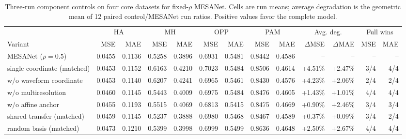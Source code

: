 \begin{table}[t]
\centering
\setlength{\tabcolsep}{1.05pt}
\caption{Three-run component controls on four core datasets for fixed-$\rho$
MESANet. Cells are run means; average degradation is the geometric mean of 12
paired control/MESANet run ratios. Positive values favor the complete model.}
\label{tab:v671-controls}
\begin{tabular}{@{}l*{4}{rr}rrrr@{}}
\toprule
& \multicolumn{2}{c}{HA} & \multicolumn{2}{c}{MH} & \multicolumn{2}{c}{OPP} & \multicolumn{2}{c}{PAM} & \multicolumn{2}{c}{Avg. deg.} & \multicolumn{2}{c}{Full wins} \\
Variant & MSE & MAE & MSE & MAE & MSE & MAE & MSE & MAE & $\Delta$MSE & $\Delta$MAE & MSE & MAE \\
\midrule
MESANet ($\rho=0.5$) & 0.0455 & 0.1136 & 0.5258 & 0.3896 & 0.6931 & 0.5481 & 0.8442 & 0.4586 & -- & -- & -- & -- \\
single coordinate (matched) & 0.0453 & 0.1152 & 0.6163 & 0.4210 & 0.7023 & 0.5484 & 0.8506 & 0.4614 & +4.51\% & +2.47\% & 3/4 & 4/4 \\
w/o waveform coordinate & 0.0453 & 0.1140 & 0.6207 & 0.4241 & 0.6965 & 0.5461 & 0.8430 & 0.4576 & +4.23\% & +2.06\% & 2/4 & 2/4 \\
w/o multiresolution & 0.0460 & 0.1145 & 0.5443 & 0.4009 & 0.6975 & 0.5484 & 0.8476 & 0.4605 & +1.43\% & +1.01\% & 4/4 & 4/4 \\
w/o affine anchor & 0.0455 & 0.1193 & 0.5515 & 0.4069 & 0.6813 & 0.5415 & 0.8475 & 0.4669 & +0.90\% & +2.46\% & 3/4 & 3/4 \\
shared transfer (matched) & 0.0459 & 0.1145 & 0.5237 & 0.3888 & 0.6980 & 0.5468 & 0.8467 & 0.4589 & +0.37\% & +0.09\% & 3/4 & 2/4 \\
random basis (matched) & 0.0473 & 0.1210 & 0.5399 & 0.3998 & 0.6999 & 0.5499 & 0.8636 & 0.4648 & +2.50\% & +2.67\% & 4/4 & 4/4 \\
\bottomrule
\end{tabular}
\end{table}
